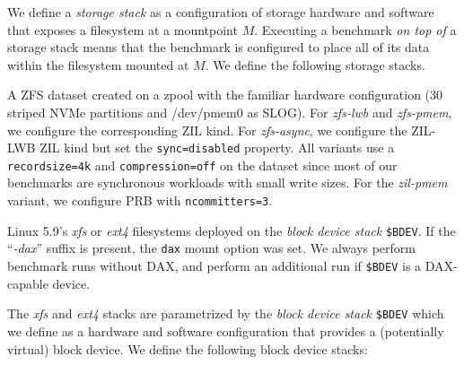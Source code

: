 \documentclass[12pt,a4paper,twoside]{book}
\begin{document}
We define a \textit{storage stack} as a configuration of storage hardware and software that exposes a filesystem at a mountpoint $M$.
Executing a benchmark \textit{on top of} a storage stack means that the benchmark is configured to place all of its data within the filesystem mounted at $M$.
We define the following storage stacks.
\begin{description}[noitemsep,leftmargin=1.5cm,labelindent=1cm]
    \item[zfs-\{lwb,pmem,async\}] A \underline{} ZFS dataset created on a zpool with the familiar hardware configuration (30 striped NVMe partitions and /dev/pmem0 as SLOG).
        For \textit{zfs-lwb} and \textit{zfs-pmem}, we configure the corresponding ZIL kind.
        For \textit{zfs-async}, we configure the ZIL-LWB ZIL kind but set the \lstinline{sync=disabled} property.
        All variants use a \lstinline{recordsize=4k} and \lstinline{compression=off} on the dataset since most of our benchmarks are synchronous workloads with small write sizes.
        For the \textit{zil-pmem} variant, we configure PRB with \lstinline{ncommitters=3}.
    \item[\{xfs,ext4\}\{,-dax\} on \$BDEV] Linux 5.9's \textit{xfs} or \textit{ext4} filesystems deployed on the \textit{block device stack} \lstinline{$BDEV}.
        If the ``\textit{-dax}'' suffix is present, the \lstinline{dax} mount option was set.
        We always perform benchmark runs without DAX, and perform an additional run if \lstinline{$BDEV} is a DAX-capable device.
\end{description}
The \textit{xfs} and \textit{ext4} stacks are parametrized by the \textit{block device stack} \lstinline{$BDEV} which we define as a hardware and software configuration that provides a (potentially virtual) block device.
We define the following block device stacks:
\end{document}
